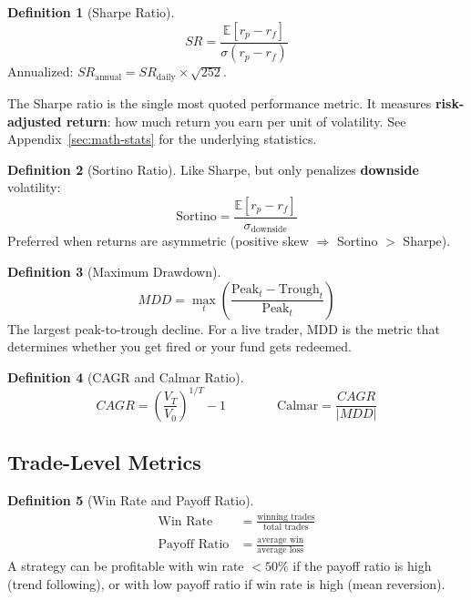 \documentclass[a4paper, 11pt]{report}
\theoremstyle{definition}
\newtheorem{definition}{Definition}[chapter]
\theoremstyle{remark}
\begin{document}
\begin{definition}[Sharpe Ratio]
    \[
        SR = \frac{\mathbb{E}[r_p - r_f]}{\sigma(r_p - r_f)}
    \]
    Annualized: $SR_{\text{annual}} = SR_{\text{daily}} \times \sqrt{252}$.

    The Sharpe ratio is the single most quoted performance metric.  It measures
    \textbf{risk-adjusted return}: how much return you earn per unit of
    volatility.  See Appendix~\ref{sec:math-stats} for the underlying
    statistics.
\end{definition}

\begin{definition}[Sortino Ratio]
    Like Sharpe, but only penalizes \textbf{downside} volatility:
    \[
        \text{Sortino} = \frac{\mathbb{E}[r_p - r_f]}{\sigma_{\text{downside}}}
    \]
    Preferred when returns are asymmetric (positive skew $\Rightarrow$ Sortino
    $>$ Sharpe).
\end{definition}

\begin{definition}[Maximum Drawdown]
    \[
        MDD = \max_{t} \left( \frac{\text{Peak}_t - \text{Trough}_t}{\text{Peak}_t} \right)
    \]
    The largest peak-to-trough decline.  For a live trader, MDD is the metric
    that determines whether you get fired or your fund gets redeemed.
\end{definition}

\begin{definition}[CAGR and Calmar Ratio]
    \[
        CAGR = \left( \frac{V_T}{V_0} \right)^{1/T} - 1
        \qquad\qquad
        \text{Calmar} = \frac{CAGR}{|MDD|}
    \]
\end{definition}

\subsection{Trade-Level Metrics}

\begin{definition}[Win Rate and Payoff Ratio]
    \begin{align}
        \text{Win Rate} &= \frac{\text{winning trades}}{\text{total trades}} \\[4pt]
        \text{Payoff Ratio} &= \frac{\text{average win}}{\text{average loss}}
    \end{align}
    A strategy can be profitable with win rate $< 50\%$ if the payoff ratio is
    high (trend following), or with low payoff ratio if win rate is high (mean
    reversion).
\end{definition}
\end{document}
